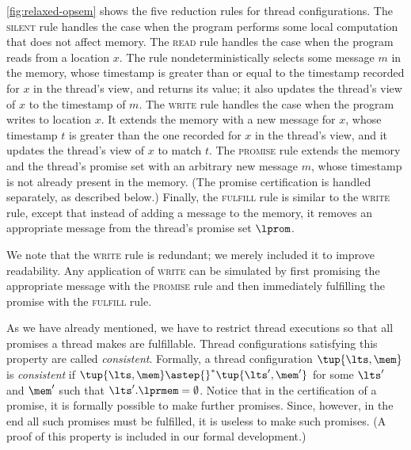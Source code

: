 \cref{fig:relaxed-opsem} shows the five reduction rules for thread
configurations.  The \textsc{silent} rule handles the case when the
program performs some local computation that does not affect memory.
The \textsc{read} rule handles the case when the program reads from a
location $x$.  The rule nondeterministically selects some message $m$
in the memory, whose timestamp is greater than or equal to the timestamp recorded
for $x$ in the thread's view, and returns its value; it also updates
the thread's view of $x$ to the timestamp of $m$.  The \textsc{write}
rule handles the case when the program writes to location $x$.  It
extends the memory with a new message for $x$, whose timestamp
$t$ is greater than the one recorded for $x$ in the thread's view, and
it updates the thread's view of $x$ to match $t$.  The
\textsc{promise} rule extends the memory and the thread's promise set
with an arbitrary new message $m$, whose timestamp is not already
present in the memory.  (The promise certification is handled
separately, as described below.)  Finally, the \textsc{fulfill} rule
is similar to the \textsc{write} rule, except that instead of
adding a message to the memory, it removes an appropriate message from
the thread's promise set $\lprom$.

We note that the \textsc{write} rule is redundant; we merely included it
to improve readability.  Any application
of \textsc{write} can be simulated by first promising the appropriate
message with the \textsc{promise} rule and then immediately fulfilling
the promise with the \textsc{fulfill} rule.


As we have already mentioned, we have to restrict thread executions so
that all promises a thread makes are fulfillable.  Thread
configurations satisfying this property are called \emph{consistent}.
Formally, a thread configuration $\tup{\lts,\mem}$ is \emph{consistent} 
if $\tup{\lts,\mem} \astep{}^* \tup{\lts',\mem'}$
for some $\lts'$ and $\mem'$ such that $\lts'.\lprmem = \emptyset$.
Notice that in the certification of a promise, it is formally possible
to make further promises.  Since, however, in the end all such
promises must be fulfilled, it is useless to make such promises.
(A proof of this property is included in our formal development.)

